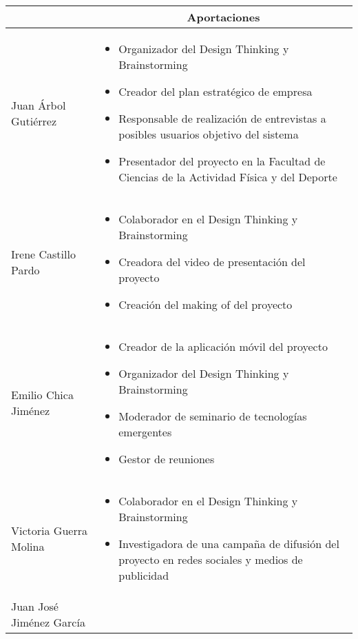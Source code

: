\newpage
\begin{longtable}{|m{4.5cm}|m{6.5cm}|}
    \hline
        \rowcolor{Gray}\multicolumn{1}{|c|}{\textbf{Integrante}}
        & \multicolumn{1}{|c|}{\textbf{Aportaciones}} \\
    \hline
        Juan Árbol Gutiérrez & \begin{itemize}
            \item Organizador del Design Thinking y Brainstorming
            \item Creador del plan estratégico de empresa
            \item Responsable de realización de entrevistas a posibles usuarios objetivo del sistema
            \item Presentador del proyecto en la Facultad de Ciencias de la Actividad Física y del Deporte
        \end{itemize} \\
    \hline
        Irene Castillo Pardo & \begin{itemize}
            \item Colaborador en el Design Thinking y Brainstorming
            \item Creadora del video de presentación del proyecto
            \item Creación del making of del proyecto
        \end{itemize} \\
    \hline
        Emilio Chica Jiménez & \begin{itemize}
            \item Creador de la aplicación móvil del proyecto
            \item Organizador del Design Thinking y Brainstorming
            \item Moderador de seminario de tecnologías emergentes
            \item Gestor de reuniones
        \end{itemize} \\
    \hline
        Victoria Guerra Molina & \begin{itemize}
            \item Colaborador en el Design Thinking y Brainstorming
            \item Investigadora de una campaña de difusión del proyecto en redes sociales y medios de publicidad
        \end{itemize} \\
    \hline
        Juan José Jiménez García & \begin{itemize}

\end{itemize}
\end{longtable}
